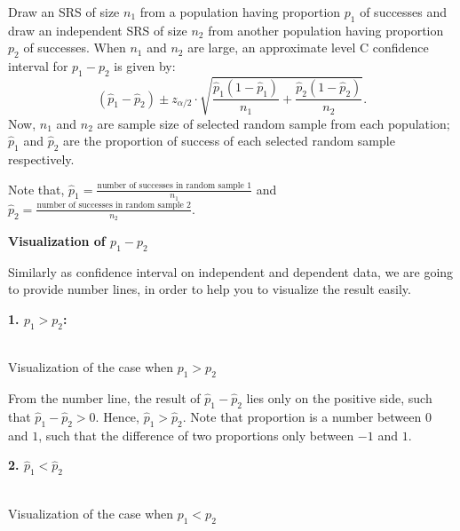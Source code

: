 \begin{definition}
Draw an SRS of size $n_1$ from a population having proportion $p_1$ of successes and draw an independent SRS of size $n_2$ from another population having proportion $p_2$ of successes. When $n_1$ and $n_2$ are large, an approximate level C confidence interval for $p_1 - p_2$ is given by: \[ (\hat{p}_1 - \hat{p}_2)  \pm z_{\alpha/2} \cdot \sqrt{ \frac{\hat{p}_1(1-\hat{p}_1)}{n_1} + \frac{\hat{p}_2(1-\hat{p}_2)}{n_2}}.\]
Now, $n_1$ and $n_2$ are sample size of selected random sample from each population; $\hat{p}_1$ and $\hat{p}_2$ are the proportion of success of each selected random sample respectively.
\end{definition}

Note that, $\hat{p}_1 = \frac{\text{number of successes in random sample 1}}{n_1}$ and $\hat{p}_2 = \frac{\text{number of successes in random sample 2}}{n_2}$.

\textbf{Visualization of $p_1 - p_2$}

Similarly as confidence interval on independent and dependent data, we are going to provide number lines, in order to help you to visualize the result easily.

\textbf{1. $p_1 > p_2$:}

\begin{center}
\vspace{0.25em}
\small\textbf{}\\Visualization of the case when $p_1 > p_2$
\end{center}

From the number line, the result of $\hat{p}_1 - \hat{p}_2$ lies only on the positive side, such that $\hat{p}_1 - \hat{p}_2 > 0$. Hence, $\hat{p}_1 > \hat{p}_2$. Note that proportion is a number between $0$ and $1$, such that the difference of two proportions only between $-1$ and $1$.

\textbf{2. $\hat{p}_1 < \hat{p}_2$}

\begin{center}
\vspace{0.25em}
\small\textbf{}\\Visualization of the case when $p_1 < p_2$
\end{center}

